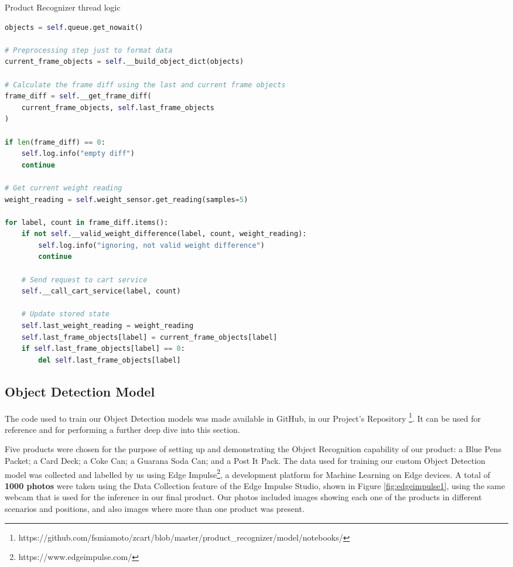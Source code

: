 \begin{sourcecode}
\caption{Product Recognizer thread logic}
\begin{lstlisting}[language=Python]
objects = self.queue.get_nowait()

# Preprocessing step just to format data
current_frame_objects = self.__build_object_dict(objects)

# Calculate the frame diff using the last and current frame objects
frame_diff = self.__get_frame_diff(
    current_frame_objects, self.last_frame_objects
)

if len(frame_diff) == 0:
    self.log.info("empty diff")
    continue

# Get current weight reading
weight_reading = self.weight_sensor.get_reading(samples=5)

for label, count in frame_diff.items():
    if not self.__valid_weight_difference(label, count, weight_reading):
        self.log.info("ignoring, not valid weight difference")
        continue

    # Send request to cart service
    self.__call_cart_service(label, count)

    # Update stored state
    self.last_weight_reading = weight_reading
    self.last_frame_objects[label] = current_frame_objects[label]
    if self.last_frame_objects[label] == 0:
        del self.last_frame_objects[label]
\end{lstlisting}
\fonte{}
\end{sourcecode}

\subsection{Object Detection Model}

The code used to train our Object Detection models was made available in GitHub,
in our Project's Repository
\footnote{https://github.com/fsmiamoto/zcart/blob/master/product\_recognizer/model/notebooks/}.
It can be used for reference and for performing a further deep dive into this section.

Five products were chosen for the purpose of setting up and demonstrating the Object Recognition 
capability of our product: a Blue Pens Packet; a Card Deck; a Coke Can; a Guarana Soda Can; 
and a Post It Pack. 
The data used for training our custom Object Detection model was collected and labelled by us
using Edge Impulse\footnote{https://www.edgeimpulse.com/}, a development platform for Machine 
Learning on Edge devices.
A total of \textbf{1000 photos} were taken using the Data Collection feature of
the Edge Impulse Studio, shown in Figure \ref{fig:edgeimpulse1}, using the same
webcam that is used for the inference in our final product. Our photos included
images showing each one of the products in different scenarios and positions,
and also images where more than one product was present.

